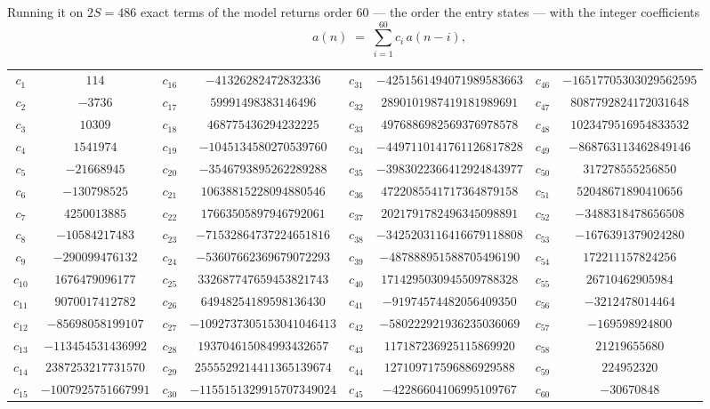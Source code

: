 \documentclass[11pt,a4paper]{article}
\theoremstyle{plain}
\theoremstyle{definition}
\begin{document}
Running it on $2S=486$ exact terms of the model returns order $60$ --- the order the
entry states --- with the integer coefficients
\[
a(n)\;=\;\sum_{i=1}^{60}c_i\,a(n-i),
\]
\begin{center}\small
\begin{tabular}{cccccccc}
$c_{1}$ & $114$ & $c_{16}$ & $-41326282472832336$ & $c_{31}$ & $-4251561494071989583663$ & $c_{46}$ & $-16517705303029562595$ \\
$c_{2}$ & $-3736$ & $c_{17}$ & $59991498383146496$ & $c_{32}$ & $2890101987419181989691$ & $c_{47}$ & $8087792824172031648$ \\
$c_{3}$ & $10309$ & $c_{18}$ & $468775436294232225$ & $c_{33}$ & $4976886982569376978578$ & $c_{48}$ & $1023479516954833532$ \\
$c_{4}$ & $1541974$ & $c_{19}$ & $-1045134580270539760$ & $c_{34}$ & $-4497110141761126817828$ & $c_{49}$ & $-868763113462849146$ \\
$c_{5}$ & $-21668945$ & $c_{20}$ & $-3546793895262289288$ & $c_{35}$ & $-3983022366412924843977$ & $c_{50}$ & $317278555256850$ \\
$c_{6}$ & $-130798525$ & $c_{21}$ & $10638815228094880546$ & $c_{36}$ & $4722085541717364879158$ & $c_{51}$ & $52048671890410656$ \\
$c_{7}$ & $4250013885$ & $c_{22}$ & $17663505897946792061$ & $c_{37}$ & $2021791782496345098891$ & $c_{52}$ & $-3488318478656508$ \\
$c_{8}$ & $-10584217483$ & $c_{23}$ & $-71532864737224651816$ & $c_{38}$ & $-3425203116416679118808$ & $c_{53}$ & $-1676391379024280$ \\
$c_{9}$ & $-290099476132$ & $c_{24}$ & $-53607662369679072293$ & $c_{39}$ & $-487888951588705496190$ & $c_{54}$ & $172211157824256$ \\
$c_{10}$ & $1676479096177$ & $c_{25}$ & $332687747659453821743$ & $c_{40}$ & $1714295030945509788328$ & $c_{55}$ & $26710462905984$ \\
$c_{11}$ & $9070017412782$ & $c_{26}$ & $64948254189598136430$ & $c_{41}$ & $-91974574482056409350$ & $c_{56}$ & $-3212478014464$ \\
$c_{12}$ & $-85698058199107$ & $c_{27}$ & $-1092737305153041046413$ & $c_{42}$ & $-580222921936235036069$ & $c_{57}$ & $-169598924800$ \\
$c_{13}$ & $-113454531436992$ & $c_{28}$ & $193704615084993432657$ & $c_{43}$ & $117187236925115869920$ & $c_{58}$ & $21219655680$ \\
$c_{14}$ & $2387253217731570$ & $c_{29}$ & $2555529214411365139674$ & $c_{44}$ & $127109717596886929588$ & $c_{59}$ & $224952320$ \\
$c_{15}$ & $-1007925751667991$ & $c_{30}$ & $-1155151329915707349024$ & $c_{45}$ & $-42286604106995109767$ & $c_{60}$ & $-30670848$ \\
\end{tabular}
\end{center}
\end{document}
